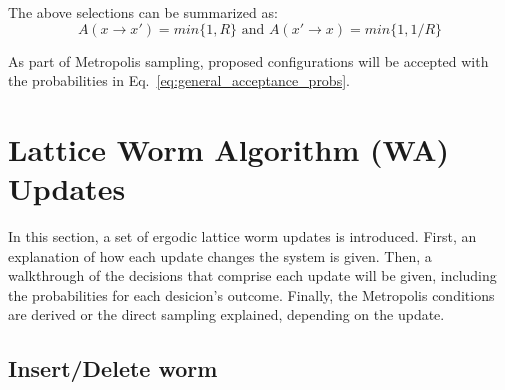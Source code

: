 \documentclass[12pt, two sided]{article}
\begin{document}
The above selections can be summarized as:
%
\begin{equation}
\label{eq:general_acceptance_probs}
A(x \to x') = min\{1,R\} \text{ and } A(x' \to x) = min\{1,1/R\}
\end{equation}
%

As part of Metropolis sampling, proposed configurations will be accepted with the probabilities in Eq.~\eqref{eq:general_acceptance_probs}.

\section{Lattice Worm Algorithm (WA) Updates}

In this section, a set of ergodic lattice worm updates is introduced. First, an explanation of how each update changes the system is given. Then, a walkthrough of the decisions that comprise each update will be given, including the probabilities for each desicion's outcome. Finally, the Metropolis conditions are derived or the direct sampling explained, depending on the update.

	\subsection{Insert/Delete worm}
        
\end{document}
